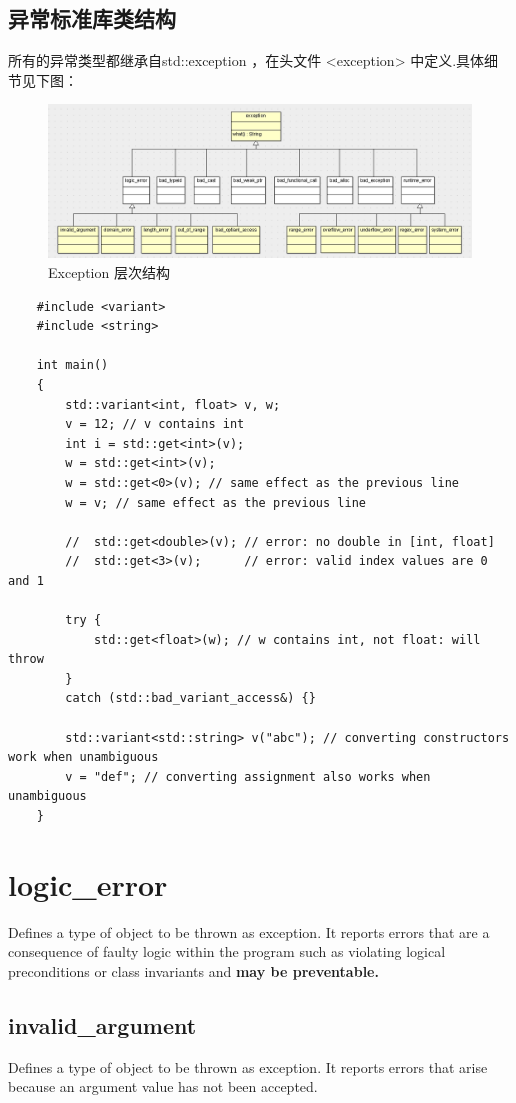 \documentclass[UTF8,a4paper,12pt]{ctexbook}
\begin{document}
		\subsection{异常标准库类结构}
			所有的异常类型都继承自std::exception ，在头文件 <exception> 中定义.具体细节见下图：
			\begin{figure}[h]
				\centering
				\includegraphics[scale = 0.45]{exception_level.png}
				\caption{Exception 层次结构}
			\end{figure}
	
\begin{lstlisting}
	#include <variant>
	#include <string>
	
	int main()
	{
		std::variant<int, float> v, w;
		v = 12; // v contains int
		int i = std::get<int>(v);
		w = std::get<int>(v);
		w = std::get<0>(v); // same effect as the previous line
		w = v; // same effect as the previous line
		
		//  std::get<double>(v); // error: no double in [int, float]
		//  std::get<3>(v);      // error: valid index values are 0 and 1
		
		try {
			std::get<float>(w); // w contains int, not float: will throw
		}
		catch (std::bad_variant_access&) {}
		
		std::variant<std::string> v("abc"); // converting constructors work when unambiguous
		v = "def"; // converting assignment also works when unambiguous
	}
\end{lstlisting} 
	\section{logic\_error}
		Defines a type of object to be thrown as exception. It reports errors that are a consequence of faulty logic within the program such as violating logical preconditions or class invariants and \textbf{may be preventable.}
		\subsection{invalid\_argument}
			Defines a type of object to be thrown as exception. It reports errors that arise because an argument value has not been accepted.
			
\end{document}

